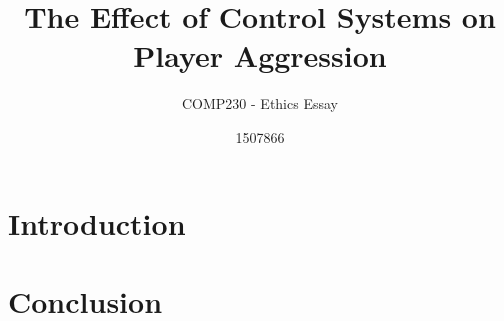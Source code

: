 \documentclass{scrartcl}
\title{The Effect of Control Systems on Player Aggression }
\subtitle{COMP230 - Ethics Essay}
\author{1507866}
\begin{document}
	
\maketitle
	
\abstract{}
	
\section{Introduction}


\section{Conclusion}

	


	
\end{document}
